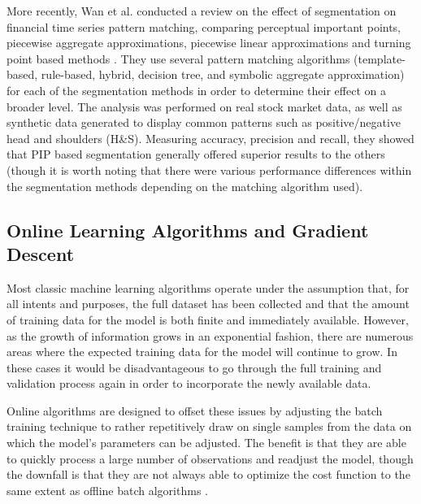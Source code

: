 \documentclass[a4paper,latin]{paper}
\begin{document}
More recently, Wan et al. conducted a review on the effect of segmentation on financial time series pattern 
matching, comparing perceptual important points, piecewise aggregate approximations, piecewise linear 
approximations and turning point based methods \cite{Wan}. They use several pattern matching algorithms 
(template-based, rule-based, hybrid, decision tree, and symbolic aggregate approximation) for each of the 
segmentation methods in order to determine their effect on a broader level. The analysis was performed on real 
stock market data, as well as synthetic data generated to display common patterns such as positive/negative 
head and shoulders (H\&S). Measuring accuracy, precision and recall, they showed that PIP based segmentation 
generally offered superior results to the others (though it is worth noting that there were various performance 
differences within the segmentation methods depending on the matching algorithm used).

\subsection{Online Learning Algorithms and Gradient Descent} \label{lr_OGD}
\hfill

Most classic machine learning algorithms operate under the assumption that, for all intents and purposes, the 
full dataset has been collected and that the amount of training data for the model is both finite and immediately 
available. However, as the growth of information grows in an exponential fashion, there are numerous areas where
 the expected training data for the model will continue to grow. In these cases it would be disadvantageous to go 
 through the full training and validation process again in order to incorporate the newly available data.
\hfill\break

Online algorithms are designed to offset these issues by adjusting the batch training technique to rather 
repetitively draw on single samples from the data on which the model’s parameters can be adjusted. The benefit 
is that they are able to quickly process a large number of observations and readjust the model, though the 
downfall is that they are not always able to optimize the cost function to the same extent as offline batch 
algorithms \cite{Albers}.
\hfill\break
\end{document}
